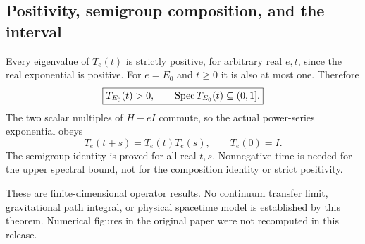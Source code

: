\subsection{Positivity, semigroup composition, and the interval}
Every eigenvalue of $T_e(t)$ is strictly positive, for arbitrary real $e,t$, since the real exponential is positive. For $e=E_0$ and $t\ge0$ it is also at most one. Therefore
\[
\boxed{T_{E_0}(t)>0,\qquad \operatorname{Spec} T_{E_0}(t)\subseteq(0,1].}
\]
The two scalar multiples of $H-eI$ commute, so the actual power-series exponential obeys
\[
\boxed{T_e(t+s)=T_e(t)T_e(s),\qquad T_e(0)=I.}
\]
The semigroup identity is proved for all real $t,s$. Nonnegative time is needed for the upper spectral bound, not for the composition identity or strict positivity.

These are finite-dimensional operator results. No continuum transfer limit, gravitational path integral, or physical spacetime model is established by this theorem. Numerical figures in the original paper were not recomputed in this release.





